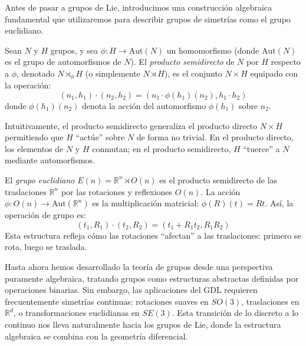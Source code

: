 Antes de pasar a grupos de Lie, introducimos una construcción algebraica fundamental que utilizaremos para describir grupos de simetrías como el grupo euclidiano.

\begin{definition}\label{def:producto_semidirecto}
Sean $N$ y $H$ grupos, y sea $\phi: H \to \mathrm{Aut}(N)$ un homomorfismo (donde $\mathrm{Aut}(N)$ es el grupo de automorfismos de $N$). El \textit{producto semidirecto} de $N$ por $H$ respecto a $\phi$, denotado $N \rtimes_\phi H$ (o simplemente $N \rtimes H$), es el conjunto $N \times H$ equipado con la operación:
\begin{equation}\label{eq:producto_semidirecto}
(n_1, h_1) \cdot (n_2, h_2) = (n_1 \cdot \phi(h_1)(n_2), h_1 \cdot h_2)
\end{equation}
donde $\phi(h_1)(n_2)$ denota la acción del automorfismo $\phi(h_1)$ sobre $n_2$.
\end{definition}

Intuitivamente, el producto semidirecto generaliza el producto directo $N \times H$ permitiendo que $H$ ``actúe'' sobre $N$ de forma no trivial. En el producto directo, los elementos de $N$ y $H$ conmutan; en el producto semidirecto, $H$ ``tuerce'' a $N$ mediante automorfismos.

\begin{example}\label{ex:grupo_euclidiano_semidirecto}
El \textit{grupo euclidiano} $E(n) = \mathbb{R}^n \rtimes O(n)$ es el producto semidirecto de las traslaciones $\mathbb{R}^n$ por las rotaciones y reflexiones $O(n)$. La acción $\phi: O(n) \to \mathrm{Aut}(\mathbb{R}^n)$ es la multiplicación matricial: $\phi(R)(t) = Rt$. Así, la operación de grupo es:
\begin{equation}
(t_1, R_1) \cdot (t_2, R_2) = (t_1 + R_1 t_2, R_1 R_2)
\end{equation}
Esta estructura refleja cómo las rotaciones ``afectan'' a las traslaciones: primero se rota, luego se traslada.
\end{example}

Hasta ahora hemos desarrollado la teoría de grupos desde una perspectiva puramente algebraica, tratando grupos como estructuras abstractas definidas por operaciones binarias. Sin embargo, las aplicaciones del \gls{GDL} requieren frecuentemente simetrías continuas: rotaciones suaves en $SO(3)$, traslaciones en $\mathbb{R}^d$, o transformaciones euclidianas en $SE(3)$. Esta transición de lo discreto a lo continuo nos lleva naturalmente hacia los grupos de Lie, donde la estructura algebraica se combina con la geometría diferencial.

